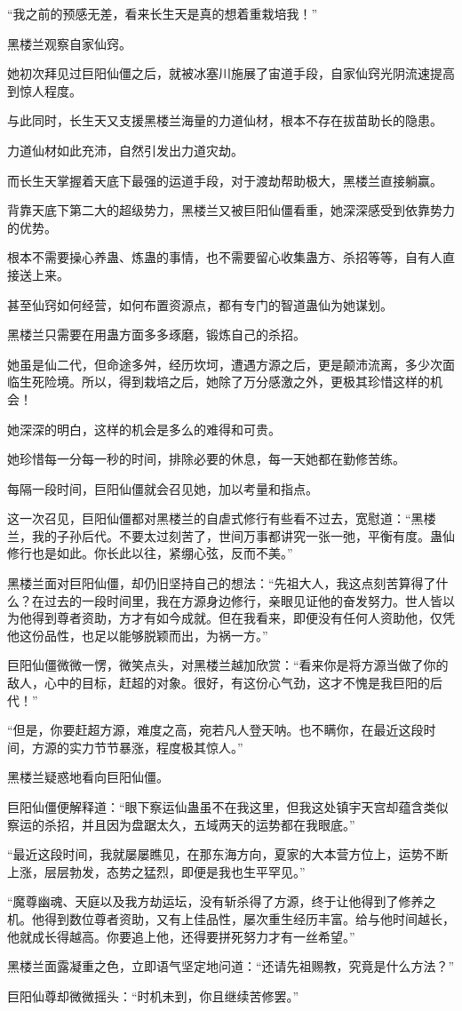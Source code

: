 \begin{this_body}
“我之前的预感无差，看来长生天是真的想着重栽培我！”

黑楼兰观察自家仙窍。

她初次拜见过巨阳仙僵之后，就被冰塞川施展了宙道手段，自家仙窍光阴流速提高到惊人程度。

与此同时，长生天又支援黑楼兰海量的力道仙材，根本不存在拔苗助长的隐患。

力道仙材如此充沛，自然引发出力道灾劫。

而长生天掌握着天底下最强的运道手段，对于渡劫帮助极大，黑楼兰直接躺赢。

背靠天底下第二大的超级势力，黑楼兰又被巨阳仙僵看重，她深深感受到依靠势力的优势。

根本不需要操心养蛊、炼蛊的事情，也不需要留心收集蛊方、杀招等等，自有人直接送上来。

甚至仙窍如何经营，如何布置资源点，都有专门的智道蛊仙为她谋划。

黑楼兰只需要在用蛊方面多多琢磨，锻炼自己的杀招。

她虽是仙二代，但命途多舛，经历坎坷，遭遇方源之后，更是颠沛流离，多少次面临生死险境。所以，得到栽培之后，她除了万分感激之外，更极其珍惜这样的机会！

她深深的明白，这样的机会是多么的难得和可贵。

她珍惜每一分每一秒的时间，排除必要的休息，每一天她都在勤修苦练。

每隔一段时间，巨阳仙僵就会召见她，加以考量和指点。

这一次召见，巨阳仙僵都对黑楼兰的自虐式修行有些看不过去，宽慰道：“黑楼兰，我的子孙后代。不要太过刻苦了，世间万事都讲究一张一弛，平衡有度。蛊仙修行也是如此。你长此以往，紧绷心弦，反而不美。”

黑楼兰面对巨阳仙僵，却仍旧坚持自己的想法：“先祖大人，我这点刻苦算得了什么？在过去的一段时间里，我在方源身边修行，亲眼见证他的奋发努力。世人皆以为他得到尊者资助，方才有如今成就。但在我看来，即便没有任何人资助他，仅凭他这份品性，也足以能够脱颖而出，为祸一方。”

巨阳仙僵微微一愣，微笑点头，对黑楼兰越加欣赏：“看来你是将方源当做了你的敌人，心中的目标，赶超的对象。很好，有这份心气劲，这才不愧是我巨阳的后代！”

“但是，你要赶超方源，难度之高，宛若凡人登天呐。也不瞒你，在最近这段时间，方源的实力节节暴涨，程度极其惊人。”

黑楼兰疑惑地看向巨阳仙僵。

巨阳仙僵便解释道：“眼下察运仙蛊虽不在我这里，但我这处镇宇天宫却蕴含类似察运的杀招，并且因为盘踞太久，五域两天的运势都在我眼底。”

“最近这段时间，我就屡屡瞧见，在那东海方向，夏家的大本营方位上，运势不断上涨，层层勃发，态势之猛烈，即便是我也生平罕见。”

“魔尊幽魂、天庭以及我方劫运坛，没有斩杀得了方源，终于让他得到了修养之机。他得到数位尊者资助，又有上佳品性，屡次重生经历丰富。给与他时间越长，他就成长得越高。你要追上他，还得要拼死努力才有一丝希望。”

黑楼兰面露凝重之色，立即语气坚定地问道：“还请先祖赐教，究竟是什么方法？”

巨阳仙尊却微微摇头：“时机未到，你且继续苦修罢。”

\end{this_body}

